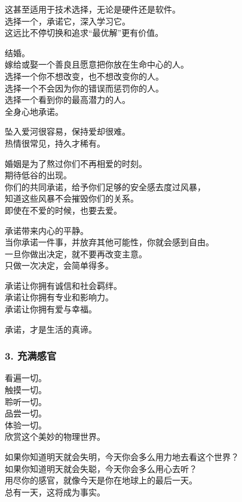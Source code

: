 \documentclass[
]{article}
\begin{document}
这甚至适用于技术选择，无论是硬件还是软件。\\
选择一个，承诺它，深入学习它。\\
这远比不停切换和追求``最优解''更有价值。

结婚。\\
嫁给或娶一个善良且愿意把你放在生命中心的人。\\
选择一个你不想改变，也不想改变你的人。\\
选择一个不会因为你的错误而惩罚你的人。\\
选择一个看到你的最高潜力的人。\\
全身心地承诺。

坠入爱河很容易，保持爱却很难。\\
热情很常见，持久才稀有。

婚姻是为了熬过你们不再相爱的时刻。\\
期待低谷的出现。\\
你们的共同承诺，给予你们足够的安全感去度过风暴，\\
知道这些风暴不会摧毁你们的关系。\\
即使在不爱的时候，也要去爱。

承诺带来内心的平静。\\
当你承诺一件事，并放弃其他可能性，你就会感到自由。\\
一旦你做出决定，就不要再改变主意。\\
只做一次决定，会简单得多。

承诺让你拥有诚信和社会羁绊。\\
承诺让你拥有专业和影响力。\\
承诺让你拥有爱与幸福。

承诺，才是生活的真谛。

\subsubsection{\texorpdfstring{3. 充满感官
}{3. 充满感官 }}\label{3-ux5145ux6ee1ux611fux5b98}

看遍一切。\\
触摸一切。\\
聆听一切。\\
品尝一切。\\
体验一切。\\
欣赏这个美妙的物理世界。

如果你知道明天就会失明，今天你会多么用力地去看这个世界？\\
如果你知道明天就会失聪，今天你会多么用心去听？\\
用尽你的感官，就像今天是你在地球上的最后一天。\\
总有一天，这将成为事实。
\end{document}
